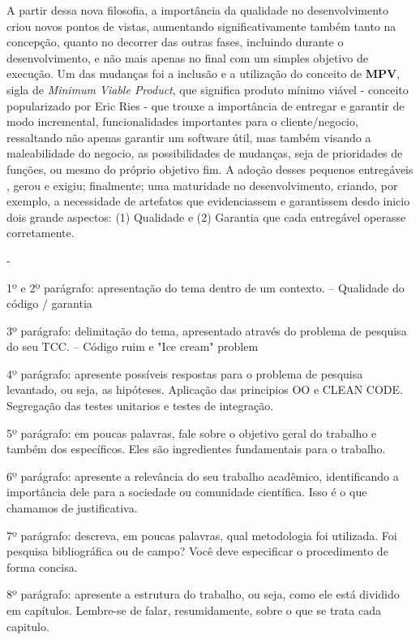 \documentclass[12pt]{article}
\begin{document}
 A partir dessa nova filosofia, a importância da qualidade no desenvolvimento criou novos pontos de vistas, aumentando significativamente também tanto na concepção, quanto no decorrer das outras fases, incluindo durante o desenvolvimento, e não mais apenas no final com um simples objetivo de execução. Um das mudanças foi a inclusão e a utilização do conceito de \textbf{MPV}, sigla de \textit{Minimum Viable Product}, que significa produto mínimo viável - conceito popularizado por Eric Ries \cite{ERICRIES_THELEAN} - que trouxe a importância de entregar e garantir de modo incremental, funcionalidades importantes para o cliente/negocio, ressaltando não apenas garantir um software útil, mas também visando a maleabilidade do negocio, as possibilidades de mudanças, seja de prioridades de funções, ou mesmo do próprio objetivo fim. A adoção desses pequenos entregáveis , gerou e exigiu; finalmente; uma maturidade no desenvolvimento, criando, por exemplo, a necessidade de artefatos que evidenciassem e garantissem desdo inicio dois grande aspectos: (1) Qualidade e (2) Garantia que cada entregável operasse corretamente.

 
 
 
 -
 
1º e 2º parágrafo: apresentação do tema dentro de um contexto.
-- Qualidade do código / garantia

3º parágrafo: delimitação do tema, apresentado através do problema de pesquisa do seu TCC.
-- Código ruim e "Ice cream" problem
 
4º parágrafo: apresente possíveis respostas para o problema de pesquisa levantado, ou seja, as hipóteses.
Aplicação das principios OO e CLEAN CODE.
Segregação das testes unitarios e testes de integração.

5º parágrafo: em poucas palavras, fale sobre o objetivo geral do trabalho e também dos específicos. Eles são ingredientes fundamentais para o trabalho.

6º parágrafo: apresente a relevância do seu trabalho acadêmico, identificando a importância dele para a sociedade ou comunidade científica. Isso é o que chamamos de justificativa.

7º parágrafo: descreva, em poucas palavras, qual metodologia foi utilizada. Foi pesquisa bibliográfica ou de campo? Você deve especificar o procedimento de forma concisa.

8º parágrafo: apresente a estrutura do trabalho, ou seja, como ele está dividido em capítulos. Lembre-se de falar, resumidamente, sobre o que se trata cada capitulo.
\end{document}
